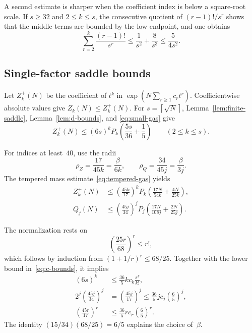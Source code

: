 \documentclass[11pt]{article}
\theoremstyle{definition}
\theoremstyle{remark}
\newcommand{\ceil}[1]{\left\lceil #1\right\rceil}
\begin{document}
A second estimate is sharper when the coefficient index is below a square-root
scale.  If $s\ge32$ and $2\le k\le s$, the consecutive quotient of
$(r-1)!/s^r$ shows that the middle terms are bounded by the low endpoint, and
one obtains
\begin{equation}\label{eq:small-gas}
  \sum_{r=2}^k\frac{(r-1)!}{s^r}
  \le\frac1{s^2}+\frac8{s^3}
  \le\frac5{4s^2}.
\end{equation}

\subsection{Single-factor saddle bounds}

Let $Z_k^+(N)$ be the coefficient of $t^k$ in
$\exp(N\sum_{r\ge1}c_rt^r)$.  Coefficientwise absolute values give
$Z_k(N)\le Z_k^+(N)$.  For $s=\ceil{\sqrt N}$,
Lemma~\ref{lem:finite-saddle}, Lemma~\ref{lem:d-bounds}, and
\eqref{eq:small-gas} give
\begin{equation}\label{eq:B-small}
  Z_k^+(N)\le(6s)^k
  P_k\left(\frac{5s}{36}+\frac15\right)
  \qquad(2\le k\le s).
\end{equation}

For indices at least~$40$, use the radii
\[
 \rho_Z=\frac{17}{45k}=\frac{\beta}{6k},
 \qquad
 \rho_Q=\frac{34}{45j}=\frac{\beta}{3j}.
\]
The tempered mass estimate~\eqref{eq:tempered-gas} yields
\begin{align}
 Z_k^+(N)&\le\left(\frac{45k}{17}\right)^k
 P_k\left(\frac{17N}{54k}+\frac{4N}{25k}\right),
 \label{eq:B-tempered}\\
 Q_j(N)&\le\left(\frac{45j}{34}\right)^j
 P_j\left(\frac{17N}{108j}+\frac{2N}{25j}\right).
 \label{eq:Q-tempered}
\end{align}

The normalization rests on
\begin{equation}\label{eq:factorial-lb}
  \left(\frac{25r}{68}\right)^r\le r!,
\end{equation}
which follows by induction from $(1+1/r)^r\le68/25$.  Together with the lower
bound in~\eqref{eq:c-bounds}, it implies
\begin{align}
 (6s)^k&\le\frac{36}{5}kc_k\frac{s^k}{k!},
 \label{eq:small-normalization}\\
 2^j\left(\frac{45j}{34}\right)^j
 &=\left(\frac{45j}{17}\right)^j
 \le\frac{36}{5}jc_j\left(\frac65\right)^j,
 \label{eq:Q-normalization}\\
 \left(\frac{45r}{17}\right)^r
 &\le\frac{36}{5}rc_r\left(\frac65\right)^r.
 \label{eq:tempered-normalization}
\end{align}
The identity
$(15/34)(68/25)=6/5$ explains the choice of~$\beta$.
\end{document}
